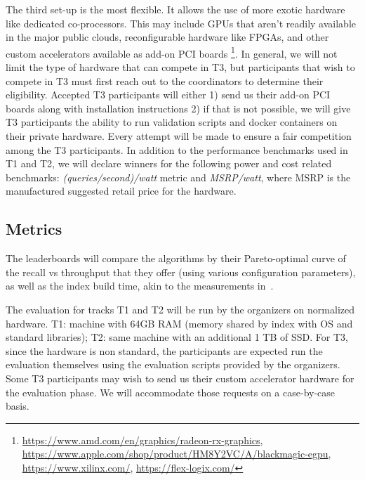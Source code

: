 The third set-up is the most flexible. It allows the use of more exotic 
hardware like dedicated co-processors. %
This may include GPUs that aren't readily available in the major public clouds, reconfigurable hardware like FPGAs, and other custom accelerators 
available as add-on PCI boards%
\footnote{\url{https://www.amd.com/en/graphics/radeon-rx-graphics},
\url{https://www.apple.com/shop/product/HM8Y2VC/A/blackmagic-egpu},
\url{https://www.xilinx.com/},
\url{https://flex-logix.com/}}.
In general, we will not limit the type of hardware that can compete in T3, but 
participants that wish to compete in T3 must first reach out to the coordinators to determine their eligibility.  Accepted T3 participants
will either 1) send us their add-on PCI boards along with installation instructions 2) if that is not possible, we will give
T3 participants the ability to run validation scripts and docker containers on their private hardware.  Every attempt will
be made to ensure a fair competition among the T3 participants.  In addition to the performance benchmarks used in T1 and T2, we will declare
winners for the following power and cost related benchmarks: \emph{(queries/second)/watt} metric and \emph{MSRP/watt}, where MSRP is the
manufactured suggested retail price for the hardware.


\subsection{Metrics}
\label{metrics}


The leaderboards will compare the algorithms by their Pareto-optimal
curve of the recall vs throughput that they offer (using various
configuration parameters), as well as the index build time, akin to
the measurements in~\cite{Benchmark}.

The evaluation for tracks T1 and T2 will be run by the organizers on
normalized hardware.  T1: machine with 64GB RAM (memory shared by
index with OS and standard libraries); T2: same machine with an
additional 1 TB of SSD.  For T3, since the hardware is non standard,
the participants are expected run the evaluation themselves using the
evaluation scripts provided by the organizers.  Some T3 participants
may wish to send us their custom accelerator hardware for the
evaluation phase.  We will accommodate those requests on a case-by-case
basis.




